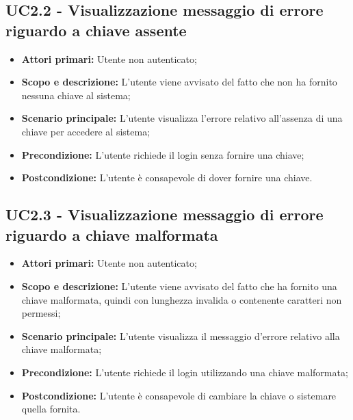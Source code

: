 \documentclass[AnalisiDeiRequisiti.tex]{subfiles}
\begin{document}
\subsection{UC2.2 - Visualizzazione messaggio di errore riguardo a chiave assente}
\begin{itemize}
	\item \textbf{Attori primari:} Utente non autenticato;\\
	\item \textbf{Scopo e descrizione:} L'utente viene avvisato del fatto che non ha fornito nessuna chiave al sistema;\\
	\item \textbf{Scenario principale:} L'utente visualizza l'errore relativo all'assenza di una chiave per accedere al sistema;\\
	\item \textbf{Precondizione:} L'utente richiede il login senza fornire una chiave;\\
	\item \textbf{Postcondizione:} L'utente è consapevole di dover fornire una chiave. \\
\end{itemize}
\subsection{UC2.3 - Visualizzazione messaggio di errore riguardo a chiave malformata}
\begin{itemize}
	\item \textbf{Attori primari:} Utente non autenticato;\\
	\item \textbf{Scopo e descrizione:} L'utente viene avvisato del fatto che ha fornito una chiave malformata, quindi con lunghezza invalida o contenente caratteri non permessi;\\
	\item \textbf{Scenario principale:} L'utente visualizza il messaggio d'errore relativo alla chiave malformata;\\
	\item \textbf{Precondizione:} L'utente richiede il login utilizzando una chiave malformata;\\
	\item \textbf{Postcondizione:} L'utente è consapevole di cambiare la chiave o sistemare quella fornita.\\
\end{itemize}
\end{document}
